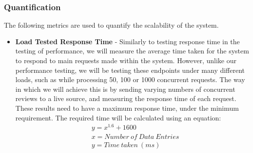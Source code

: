 \documentclass[12pt]{article}
\begin{document}
\subsubsection{Quantification}
The following metrics are used to quantify the scalability of the system.
\begin{itemize}
    \item \textbf{Load Tested Response Time} - Similarly to testing response time in the testing of performance, we will measure the average time taken for the system to respond to main requests made within the system. However, unlike our performance testing, we will be testing these endpoints under many different loads, such as while processing 50, 100 or 1000 concurrent requests.
          The way in which we will achieve this is by sending varying numbers of concurrent reviews to a live source, and measuring the response time of each request. These results need to have a maximum response time, under the minimum requirement.
          The required time will be calculated using an equation:
          \begin{equation}
              \begin{aligned}
                   & y=x^{1.6}+1600               \\
                   & x= Number\:of\:Data\:Entries \\
                   & y= Time\:taken\:(ms)         \\
              \end{aligned}
          \end{equation}
\end{itemize}
\end{document}

